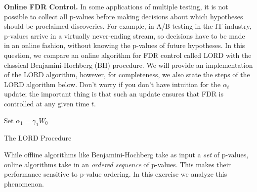 \documentclass[12pt, addpoints]{exam}
\theoremstyle{plain}
\begin{document}
\begin{questions}
    
     \question[20] \textbf{Online FDR Control.}  In some applications of multiple testing, it is not possible to collect all p-values before making decisions about which hypotheses should be proclaimed discoveries. For example, in A/B testing in the IT industry, p-values arrive in a virtually never-ending stream, so decisions have to be made in an online fashion, without knowing the p-values of future hypotheses. In this question, we compare an online algorithm for FDR control called LORD with the classical Benjamini-Hochberg (BH) procedure. We will provide an implementation of the LORD algorithm, however, for completeness, we also state the steps of the LORD algorithm below. Don't worry if you don't have intuition for the $\alpha_t$ update; the important thing is that such an update ensures that FDR is controlled at any given time $t$.
     
     \begin{algorithm}[H]
\SetAlgoLined
{}
Set $\alpha_1 = \gamma_1 W_0$\newline
 \caption{The LORD Procedure}
\end{algorithm}

While offline algorithms like Benjamini-Hochberg take as input a \emph{set} of p-values, online algorithms take in an \emph{ordered sequence} of p-values. This makes their performance sensitive to p-value ordering. In this exercise we analyze this phenomenon.

\begin{parts}

\end{parts}
\end{questions}
\end{document}
